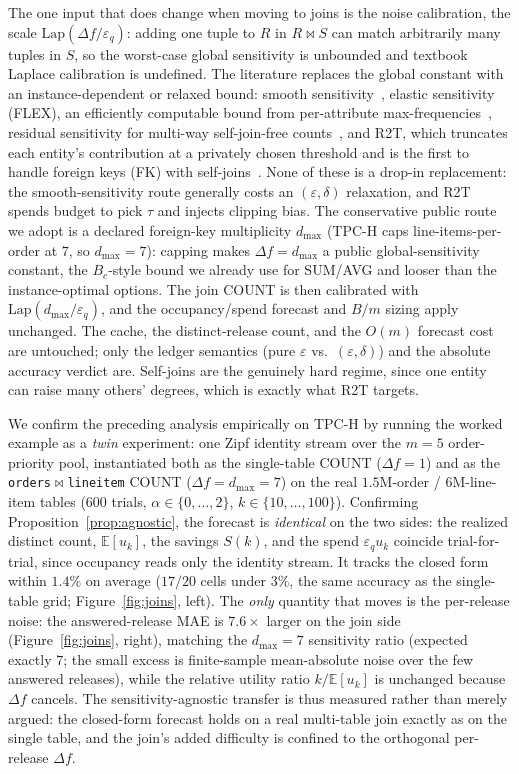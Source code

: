 \documentclass[sigconf,nonacm]{acmart}
\newcommand{\eps}{\varepsilon}
\newcommand{\E}{\mathbb{E}}
\newcommand{\Lap}{\mathrm{Lap}}
\begin{document}
The one input that does change when moving to joins is the noise calibration, the scale $\Lap(\Delta f/\eps_q)$: adding one tuple to $R$ in $R\bowtie S$ can match arbitrarily many tuples in $S$, so the worst-case global sensitivity is unbounded and textbook Laplace calibration is undefined. The literature replaces the global constant with an instance-dependent or relaxed bound: smooth sensitivity~\cite{nissim2007smooth}, elastic sensitivity (FLEX), an efficiently computable bound from per-attribute max-frequencies~\cite{johnson2018towards}, residual sensitivity for multi-way self-join-free counts~\cite{dong2021residual}, and R2T, which truncates each entity's contribution at a privately chosen threshold and is the first to handle foreign keys (FK) with self-joins~\cite{dong2022r2t}. None of these is a drop-in replacement: the smooth-sensitivity route generally costs an $(\eps,\delta)$ relaxation, and R2T spends budget to pick $\tau$ and injects clipping bias. The conservative public route we adopt is a declared foreign-key multiplicity $d_{\max}$ (TPC-H caps line-items-per-order at $7$, so $d_{\max}{=}7$): capping makes $\Delta f{=}d_{\max}$ a public global-sensitivity constant, the $B_c$-style bound we already use for SUM/AVG and looser than the instance-optimal options. The join COUNT is then calibrated with $\Lap(d_{\max}/\eps_q)$, and the occupancy/spend forecast and $B/m$ sizing apply unchanged. The cache, the distinct-release count, and the $O(m)$ forecast cost are untouched; only the ledger semantics (pure $\eps$ vs.\ $(\eps,\delta)$) and the absolute accuracy verdict are. Self-joins are the genuinely hard regime, since one entity can raise many others' degrees, which is exactly what R2T targets.

We confirm the preceding analysis empirically on TPC-H by running the worked example as a \emph{twin} experiment: one Zipf identity stream over the $m{=}5$ order-priority pool, instantiated both as the single-table COUNT ($\Delta f{=}1$) and as the \texttt{orders}$\bowtie$\texttt{lineitem} COUNT ($\Delta f{=}d_{\max}{=}7$) on the real $1.5$M-order / $6$M-line-item tables ($600$ trials, $\alpha\in\{0,\dots,2\}$, $k\in\{10,\dots,100\}$). Confirming Proposition~\ref{prop:agnostic}, the forecast is \emph{identical} on the two sides: the realized distinct count, $\E[u_k]$, the savings $S(k)$, and the spend $\eps_q u_k$ coincide trial-for-trial, since occupancy reads only the identity stream. It tracks the closed form within $1.4\%$ on average ($17/20$ cells under $3\%$, the same accuracy as the single-table grid; Figure~\ref{fig:joins}, left). The \emph{only} quantity that moves is the per-release noise: the answered-release MAE is $7.6\times$ larger on the join side (Figure~\ref{fig:joins}, right), matching the $d_{\max}{=}7$ sensitivity ratio (expected exactly $7$; the small excess is finite-sample mean-absolute noise over the few answered releases), while the relative utility ratio $k/\E[u_k]$ is unchanged because $\Delta f$ cancels. The sensitivity-agnostic transfer is thus measured rather than merely argued: the closed-form forecast holds on a real multi-table join exactly as on the single table, and the join's added difficulty is confined to the orthogonal per-release $\Delta f$.
\end{document}
